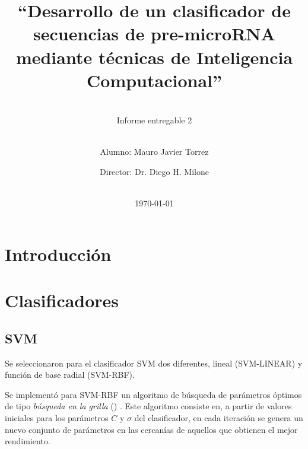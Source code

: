 \documentclass[12pt,bibliography=oldstyle,DIV=12,parskip=half-,titlepage]{scrartcl}
\begin{document}
%
%
\titlehead{\center\large
    Universidad Nacional del Litoral\\
    Facultad de Ingeniería y Ciencias Hídricas
}
%
%
\title{\LARGE ``Desarrollo de un clasificador de secuencias de pre-microRNA
  mediante técnicas de Inteligencia Computacional''}
\subject{Proyecto Final de Carrera\\Ingeniería en
  Informática}
\subtitle{~\\[.2ex]Informe entregable 2\\[.2ex]~}
\author{{Alumno: Mauro Javier Torrez}\and{Director: Dr. Diego H. Milone}}
%
\date{~\\[2em]\today}
%
\renewcommand*{\titlepagestyle}{empty}
\maketitle
\setcounter{page}{1}
%
%
%
%
\section{Introducción}


\section{Clasificadores}

\subsection{SVM}
Se seleccionaron para el clasificador SVM dos 
\cite{bottou} diferentes, lineal (SVM-LINEAR) y función de base radial
(SVM-RBF).  

Se implementó para SVM-RBF un algoritmo de búsqueda de parámetros
óptimos de tipo \emph{búsqueda en la grilla} () \cite{hsu}.
Este algoritmo consiste en, a partir de valores iniciales para los
parámetros $C$ y $\sigma$ del clasificador, en cada iteración se
genera un nuevo conjunto de parámetros en las cercanías de aquellos
que obtienen el mejor rendimiento. 
\end{document}
